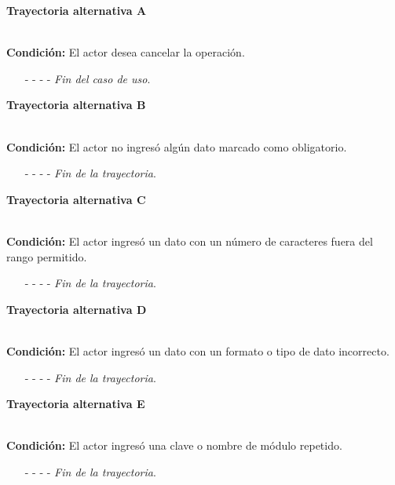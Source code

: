 \hypertarget{CU5-2:TAA}{\textbf{Trayectoria alternativa A}}\\
\noindent \textbf{Condición:} El actor desea cancelar la operación.
\begin{enumerate}
	\UCpaso[\UCactor] Solicita cancelar la operación oprimiendo el botón  de la pantalla 
	\UCpaso[\UCsist] Muestra la pantalla .
	\item[- -] - - {\em {Fin del caso de uso}}.%
\end{enumerate}
\hypertarget{CU5-2:TAB}{\textbf{Trayectoria alternativa B}}\\
\noindent \textbf{Condición:} El actor no ingresó algún dato marcado como obligatorio.
\begin{enumerate}
	\UCpaso[\UCsist] Muestra el mensaje  señalando el campo que presenta el error en la pantalla .
	\UCpaso Regresa al paso \ref{CU5.2-P4} de la trayectoria principal.
	\item[- -] - - {\em {Fin de la trayectoria}}.%
\end{enumerate}
\hypertarget{CU5-2:TAC}{\textbf{Trayectoria alternativa C}}\\
\noindent \textbf{Condición:} El actor ingresó un dato con un número de caracteres fuera del rango permitido.
\begin{enumerate}
	\UCpaso[\UCsist] Muestra el mensaje  señalando el campo que presenta el error en la pantalla .
	\UCpaso Regresa al paso \ref{CU5.2-P4} de la trayectoria principal.
	\item[- -] - - {\em {Fin de la trayectoria}}.%
\end{enumerate}
\hypertarget{CU5-2:TAD}{\textbf{Trayectoria alternativa D}}\\
\noindent \textbf{Condición:} El actor ingresó un dato con un formato o tipo de dato incorrecto.
\begin{enumerate}
	\UCpaso[\UCsist] Muestra el mensaje  señalando el campo que presenta el error en la pantalla .
	\UCpaso Regresa al paso \ref{CU5.2-P4} de la trayectoria principal.
	\item[- -] - - {\em {Fin de la trayectoria}}.
\end{enumerate}
\hypertarget{CU5-2:TAE}{\textbf{Trayectoria alternativa E}}\\
\noindent \textbf{Condición:} El actor ingresó una clave o nombre de módulo repetido.
\begin{enumerate}
	\UCpaso[\UCsist] Muestra el mensaje  señalando el campo que presenta la duplicidad en la pantalla 
	\UCpaso Regresa al paso \ref{CU5.2-P4} de la trayectoria principal.
	\item[- -] - - {\em {Fin de la trayectoria}}.
\end{enumerate}